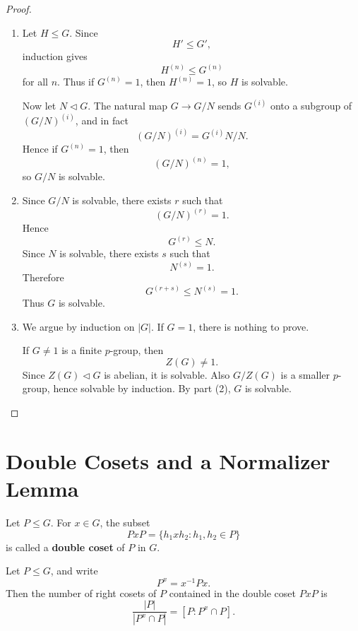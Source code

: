 \begin{proof}
\begin{enumerate}[label=(\arabic*)]
    \item Let \(H\leq G\). Since
    \[
        H'\leq G',
    \]
    induction gives
    \[
        H^{(n)}\leq G^{(n)}
    \]
    for all \(n\). Thus if \(G^{(n)}=1\), then \(H^{(n)}=1\), so \(H\) is solvable.

    Now let \(N\lhd G\). The natural map \(G\to G/N\) sends \(G^{(i)}\) onto a subgroup of
    \((G/N)^{(i)}\), and in fact
    \[
        (G/N)^{(i)}
        =
        G^{(i)}N/N.
    \]
    Hence if \(G^{(n)}=1\), then
    \[
        (G/N)^{(n)}=1,
    \]
    so \(G/N\) is solvable.

    \item Since \(G/N\) is solvable, there exists \(r\) such that
    \[
        (G/N)^{(r)}=1.
    \]
    Hence
    \[
        G^{(r)}\leq N.
    \]
    Since \(N\) is solvable, there exists \(s\) such that
    \[
        N^{(s)}=1.
    \]
    Therefore
    \[
        G^{(r+s)}
        \leq N^{(s)}
        =
        1.
    \]
    Thus \(G\) is solvable.

    \item We argue by induction on \(|G|\). If \(G=1\), there is nothing to prove.

    If \(G\neq 1\) is a finite \(p\)-group, then
    \[
        Z(G)\neq 1.
    \]
    Since \(Z(G)\lhd G\) is abelian, it is solvable. Also \(G/Z(G)\) is a smaller \(p\)-group, hence solvable by induction. By part (2), \(G\) is solvable.
\end{enumerate}
\end{proof}

\section{Double Cosets and a Normalizer Lemma}

\begin{definition}
Let \(P\leq G\). For \(x\in G\), the subset
\[
    PxP
    =
    \{h_1xh_2:h_1,h_2\in P\}
\]
is called a \textbf{double coset} of \(P\) in \(G\).
\end{definition}

\begin{lemma}
Let \(P\leq G\), and write
\[
    P^x=x^{-1}Px.
\]
Then the number of right cosets of \(P\) contained in the double coset \(PxP\) is
\[
    \frac{|P|}{|P^x\cap P|}
    =
    [P:P^x\cap P].
\]
\end{lemma}

